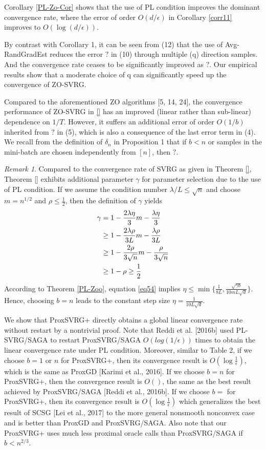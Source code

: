 \documentclass{article}
\theoremstyle{definition}
\theoremstyle{remark}
\newtheorem{remark}[theorem]{Remark}
\begin{document}
Corollary \ref{PL-Zo-Cor} shows that the use of PL condition improves the dominant convergence rate, where the error of
order $O(d/\epsilon)$ in Corollary \ref{corr11} improves to $O(\log(d/\epsilon))$.
{\color{Brown}
By contrast with Corollary 1, it can be seen from (12) that the use of Avg-RandGradEst reduces the
error $?$ in (10) through multiple (q) direction samples. And the convergence rate ceases to
be significantly improved as $?$. Our empirical results show that a moderate choice of q can
significantly speed up the convergence of ZO-SVRG.

Compared to the aforementioned ZO algorithms [5, 14, 24], the convergence performance of ZO-SVRG in \eqref{} has an improved (linear rather than sub-linear) dependence on $1/T$. However, it suffers an additional error of order $O(1/b)$ inherited
from $?$ in (5), which is also a consequence of the last error term in (4). We recall from the
definition of $\delta_n$ in Proposition 1 that if $b < n$ or samples in the mini-batch are chosen independently
from $[n]$, then $?$.
}
\begin{remark}
Compared to the convergence rate of SVRG as given in Theorem \ref{}, Theorem \ref{} exhibits additional parameter $\gamma$ for parameter selection due to the use of PL condition. 
If we assume the condition number $\lambda/L\leq \sqrt{n}$ and choose $m = n^{1/2}$ and $\rho\leq \frac{1}{2}$, then the definition of $\gamma$ yields  
\begin{align}
\gamma &= 1-\frac{2\lambda\eta}{3} m-\frac{\lambda\eta}{3}\notag \\
& \geq 1 - \frac{2\lambda\rho}{3L}m - \frac{\lambda\rho}{3L}\notag\\
& \geq  1 - \frac{2\rho}{3\sqrt{n}}m - \frac{\rho}{3\sqrt{n}}\notag\\
& \geq  1 - \rho \geq \frac{1}{2}\label{eq54}
\end{align}
According to Theorem \ref{PL-Zoo}, equation \eqref{eq54} implies $\eta \leq \min\{\frac{1}{8L}, \frac{\sqrt{\gamma b}}{10 m L \sqrt{d}}\}$. 
Hence, choosing $b = n$ leads to the constant step size  $\eta = \frac{1}{10 L \sqrt{d}}$.
\end{remark}
{\color{Violet}
We show that ProxSVRG+ directly obtains a global linear convergence rate without restart by a nontrivial proof. Note that Reddi et al. [2016b] used PL-SVRG/SAGA to restart ProxSVRG/SAGA $O(log(1/\epsilon))$ times to obtain
the linear convergence rate under PL condition.
Moreover, similar to Table 2, if we choose $b = 1$ or $n$ for ProxSVRG+, then its convergence result is $O(\log \frac{1}{\epsilon})$,
which is the same as ProxGD [Karimi et al., 2016]. If we choose $b = n$ for ProxSVRG+, then the convergence result is $O()$, the same as the best result achieved by ProxSVRG/SAGA [Reddi et al., 2016b]. If we
choose $b = $ for ProxSVRG+, then its convergence result is $O(\log\frac{1}{\epsilon})$
which generalizes the best result of SCSG [Lei et al., 2017] to the more general nonsmooth nonconvex case and is better than ProxGD and ProxSVRG/SAGA. Also note that our ProxSVRG+ uses much less proximal oracle calls than ProxSVRG/SAGA if $b < n ^{2/3}$.

}
\end{document}
